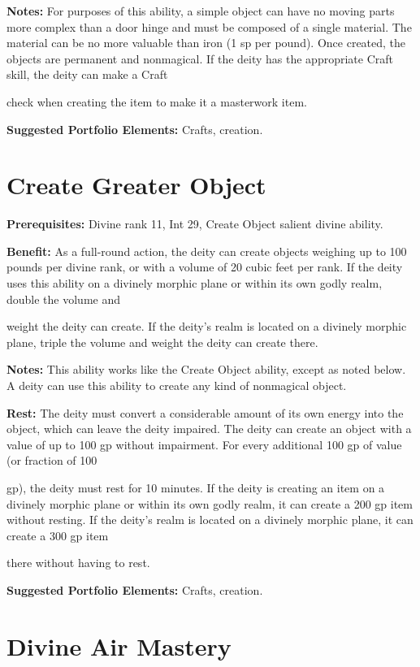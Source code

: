 \documentclass{article}
\begin{document}
\textbf{Notes:} For purposes of this ability, a simple object can have no moving 
parts more complex than a door hinge and must be composed of a single material. 
The material can be no more valuable than iron (1 sp per pound). Once created, 
the objects are permanent and nonmagical. If the deity has the appropriate Craft 
skill, the deity can make a Craft

check when creating the item to make it a masterwork item.

\textbf{Suggested Portfolio Elements:} Crafts, creation.

\vspace{12pt}
\section*{Create Greater Object}

\textbf{Prerequisites:} Divine rank 11, Int 29, Create Object salient divine ability.

\textbf{Benefit:} As a full-round action, the deity can create objects weighing 
up to 100 pounds per divine rank, or with a volume of 20 cubic feet per rank. If 
the deity uses this ability on a divinely morphic plane or within its own godly 
realm, double the volume and

weight the deity can create. If the deity's realm is located on a divinely morphic 
plane, triple the volume and weight the deity can create there.

\textbf{Notes:} This ability works like the Create Object ability, except as noted 
below. A deity can use this ability to create any kind of nonmagical object.

\textbf{Rest: }The deity must convert a considerable amount of its own energy into 
the object, which can leave the deity impaired. The deity can create an object 
with a value of up to 100 gp without impairment. For every additional 100 gp of 
value (or fraction of 100

gp), the deity must rest for 10 minutes. If the deity is creating an item on a 
divinely morphic plane or within its own godly realm, it can create a 200 gp item 
without resting. If the deity's realm is located on a divinely morphic plane, it 
can create a 300 gp item

there without having to rest.

\textbf{Suggested Portfolio Elements:} Crafts, creation.

\vspace{12pt}
\section*{Divine Air Mastery}
\end{document}
